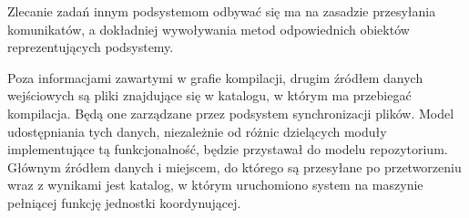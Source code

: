 \documentclass[a4paper]{article}
\begin{document}
Zlecanie zadań innym podsystemom odbywać się ma na zasadzie przesyłania komunikatów, a dokładniej wywoływania metod odpowiednich obiektów reprezentujących podsystemy.

Poza informacjami zawartymi w grafie kompilacji, drugim źródłem danych wejściowych są pliki znajdujące się w katalogu, w którym ma przebiegać kompilacja.
Będą one zarządzane przez podsystem synchronizacji plików.
Model udostępniania tych danych, niezależnie od różnic dzielących moduły implementujące tą funkcjonalność, będzie przystawał do modelu repozytorium.
Głównym źródłem danych i miejscem, do którego są przesyłane po przetworzeniu wraz z wynikami jest katalog, w którym uruchomiono system na maszynie pełniącej funkcję jednostki koordynującej.
\end{document}
